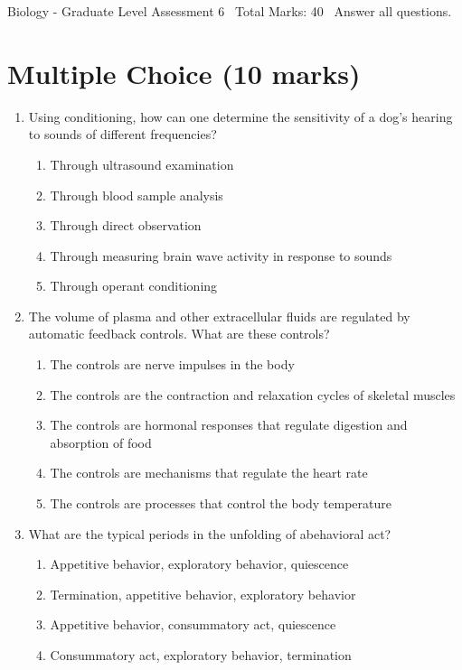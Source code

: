 \documentclass[12pt]{article}
\begin{document}
\begin{center}
Biology - Graduate Level Assessment 6 \
Total Marks: 40 \
Answer all questions.
\end{center}

\section*{Multiple Choice (10 marks)}
\begin{enumerate}[label=\arabic*.]
\item Using conditioning, how can one determine the sensitivity of a dog's hearing to sounds of different frequencies?
\begin{enumerate}[label=(\alph*)]
    \item Through ultrasound examination
    \item Through blood sample analysis
    \item Through direct observation
    \item Through measuring brain wave activity in response to sounds
    \item Through operant conditioning
\end{enumerate}
\item The volume of plasma and other extracellular fluids are regulated by automatic feedback controls. What are these controls?
\begin{enumerate}[label=(\alph*)]
    \item The controls are nerve impulses in the body
    \item The controls are the contraction and relaxation cycles of skeletal muscles
    \item The controls are hormonal responses that regulate digestion and absorption of food
    \item The controls are mechanisms that regulate the heart rate
    \item The controls are processes that control the body temperature
\end{enumerate}
\item What are the typical periods in the unfolding of abehavioral act?
\begin{enumerate}[label=(\alph*)]
    \item Appetitive behavior, exploratory behavior, quiescence
    \item Termination, appetitive behavior, exploratory behavior
    \item Appetitive behavior, consummatory act, quiescence
    \item Consummatory act, exploratory behavior, termination

\end{enumerate}
\end{enumerate}
\end{document}
